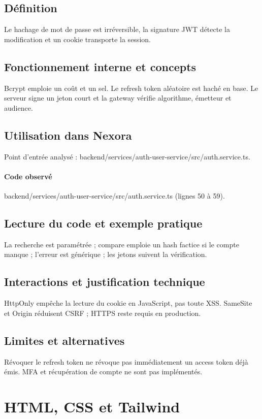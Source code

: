\subsection*{Définition}
Le hachage de mot de passe est irréversible, la signature JWT détecte la modification et un cookie transporte la session.

\subsection*{Fonctionnement interne et concepts}
Bcrypt emploie un coût et un sel. Le refresh token aléatoire est haché en base. Le serveur signe un jeton court et la gateway vérifie algorithme, émetteur et audience.

\subsection*{Utilisation dans Nexora}
Point d’entrée analysé : backend/services/auth-user-service/src/auth.service.ts.

\paragraph{Code observé} backend/services/auth-user-service/src/auth.service.ts (lignes 50 à 59).

\subsection*{Lecture du code et exemple pratique}
La recherche est paramétrée ; compare emploie un hash factice si le compte manque ; l’erreur est générique ; les jetons suivent la vérification.

\subsection*{Interactions et justification technique}
HttpOnly empêche la lecture du cookie en JavaScript, pas toute XSS. SameSite et Origin réduisent CSRF ; HTTPS reste requis en production.

\subsection*{Limites et alternatives}
Révoquer le refresh token ne révoque pas immédiatement un access token déjà émis. MFA et récupération de compte ne sont pas implémentés.

\section{HTML, CSS et Tailwind}
